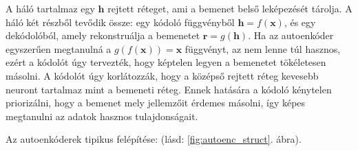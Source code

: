 
A háló tartalmaz egy $\textbf{h}$ rejtett réteget, ami a bemenet belső leképezését tárolja. A háló két részből tevődik össze: egy kódoló függvényből $\textbf{h} = f(\textbf{x})$, és egy dekódolóból, amely rekonstruálja a bemenetet $\textbf{r} = g(\textbf{h})$. Ha az autoenkóder egyszerűen megtanulná a $g(f(\textbf{x})) = \textbf{x}$ függvényt, az nem lenne túl hasznos, ezért a kódolót úgy tervezték, hogy képtelen legyen a bemenetet tökéletesen másolni. A kódolót úgy korlátozzák, hogy a középső rejtett réteg kevesebb neuront tartalmaz mint a bemeneti réteg. Ennek hatására a kódoló kénytelen priorizálni, hogy a bemenet mely jellemzőit érdemes másolni, így képes megtanulni az adatok hasznos tulajdonságait.

Az autoenkóderek tipikus felépítése: (lásd: \ref{fig:autoenc_struct}. ábra).


  
